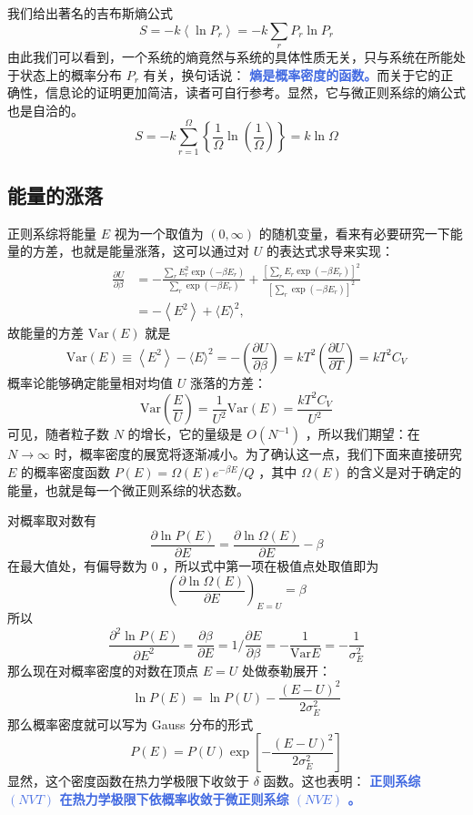我们给出著名的吉布斯熵公式
\begin{equation}\label{equ:GibbsS}
    S=-k\left\langle\ln P_r\right\rangle=-k \sum_r P_r \ln P_r
\end{equation}
由此我们可以看到，一个系统的熵竟然与系统的具体性质无关，只与系统在所能处于状态上的概率分布 $P_r$ 有关，换句话说： \textcolor{RoyalBlue}{\textbf{\kaishu 熵是概率密度的函数。}}而关于它的正确性，信息论的证明更加简洁，读者可自行参考。显然，它与微正则系综的熵公式也是自洽的。
\[
    S=-k \sum_{r=1}^{\Omega}\left\{\frac{1}{\Omega} \ln \left(\frac{1}{\Omega}\right)\right\}=k \ln \Omega
\]

\subsection{能量的涨落}

正则系综将能量 $E$ 视为一个取值为 $(0, \infty)$ 的随机变量，看来有必要研究一下能量的方差，也就是能量涨落，这可以通过对 $U$ 的表达式求导来实现：
\[
    \begin{aligned}
\frac{\partial U}{\partial \beta} & =-\frac{\displaystyle\sum_r E_r^2 \exp \left(-\beta E_r\right)}{\displaystyle\sum_r \exp \left(-\beta E_r\right)}+\frac{\left[\displaystyle\sum_r E_r \exp \left(-\beta E_r\right)\right]^2}{\left[\displaystyle\sum_r \exp \left(-\beta E_r\right)\right]^2} \\
& =-\left\langle E^2\right\rangle+\langle E\rangle^2,
\end{aligned}
\]
故能量的方差 $\text{Var}(E)$ 就是
\begin{equation}\label{equ:label}
    \text{Var}(E) \equiv\left\langle E^2\right\rangle-\langle E\rangle^2=-\left(\frac{\partial U}{\partial \beta}\right)=k T^2\left(\frac{\partial U}{\partial T}\right)=k T^2 C_V
\end{equation}
概率论能够确定能量相对均值 $U$ 涨落的方差：
\[
    \text{Var}\left(\frac{E}{U} \right) = \frac{1}{U^2} \text{Var}(E) = \frac{k T^2 C_V}{U^2} 
\]
可见，随者粒子数 $N$ 的增长，它的量级是 $O(N^{-1})$ ，所以我们期望：在 $N \rightarrow \infty$ 时，概率密度的展宽将逐渐减小。为了确认这一点，我们下面来直接研究 $E$ 的概率密度函数 $P(E) = \Omega(E)e^{-\beta E}/Q$ ，其中 $\Omega(E)$ 的含义是对于确定的能量，也就是每一个微正则系综的状态数。

对概率取对数有
\[
    \frac{\partial \ln P(E)}{\partial E} = \frac{\partial \ln \Omega (E)}{\partial E} - \beta
\]
在最大值处，有偏导数为 $0$ ，所以式中第一项在极值点处取值即为
\[
    \left(\frac{\partial \ln \Omega (E)}{\partial E}\right)_{E = U} = \beta
\]
所以
\[
    \frac{\partial^2 \ln P(E)}{\partial E^2} = \frac{\partial \beta}{\partial E} = 1\bigg/\frac{\partial E}{\partial \beta} = -\frac{1}{\text{Var}E}  = -\frac{1}{\sigma^2_E}
\]
那么现在对概率密度的对数在顶点 $E = U$ 处做泰勒展开：
\[
    \ln P(E) = \ln P(U) -\frac{(E - U)^2}{2\sigma^2_E}
\]
那么概率密度就可以写为 Gauss 分布的形式
\begin{equation}
    P(E) = P(U)\exp\left[-\frac{(E - U)^2}{2\sigma^2_E}\right]
\end{equation}
显然，这个密度函数在热力学极限下收敛于 $\delta$ 函数。这也表明： \textcolor{RoyalBlue}{\textbf{\kaishu 正则系综 $(NVT)$ 在热力学极限下依概率收敛于微正则系综 $(NVE)$ 。}}

